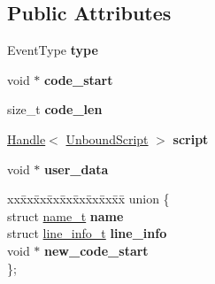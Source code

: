 \subsection*{Public Attributes}
\begin{DoxyCompactItemize}
\item 
\hypertarget{structv8_1_1_jit_code_event_ace1fbc4119ac3ef609d8e0f89cbc2c9f}{}Event\+Type {\bfseries type}\label{structv8_1_1_jit_code_event_ace1fbc4119ac3ef609d8e0f89cbc2c9f}

\item 
\hypertarget{structv8_1_1_jit_code_event_aeeac614e6c125bf08bf785b070090d0f}{}void $\ast$ {\bfseries code\+\_\+start}\label{structv8_1_1_jit_code_event_aeeac614e6c125bf08bf785b070090d0f}

\item 
\hypertarget{structv8_1_1_jit_code_event_ad56f78749d03f5db29ed417c2f3b4666}{}size\+\_\+t {\bfseries code\+\_\+len}\label{structv8_1_1_jit_code_event_ad56f78749d03f5db29ed417c2f3b4666}

\item 
\hypertarget{structv8_1_1_jit_code_event_a7c42ba82323ed1e91c5ef3f181c96d1e}{}\hyperlink{classv8_1_1_local}{Handle}$<$ \hyperlink{classv8_1_1_unbound_script}{Unbound\+Script} $>$ {\bfseries script}\label{structv8_1_1_jit_code_event_a7c42ba82323ed1e91c5ef3f181c96d1e}

\item 
\hypertarget{structv8_1_1_jit_code_event_a90597e06440ebd68fe582bd1361d6de6}{}void $\ast$ {\bfseries user\+\_\+data}\label{structv8_1_1_jit_code_event_a90597e06440ebd68fe582bd1361d6de6}

\item 
\hypertarget{structv8_1_1_jit_code_event_af7964de4fa0dd0e4cf77749493ab606c}{}\begin{tabbing}
xx\=xx\=xx\=xx\=xx\=xx\=xx\=xx\=xx\=\kill
union \{\\
\>struct \hyperlink{structv8_1_1_jit_code_event_1_1name__t}{name\_t} {\bfseries name}\\
\>struct \hyperlink{structv8_1_1_jit_code_event_1_1line__info__t}{line\_info\_t} {\bfseries line\_info}\\
\>void $\ast$ {\bfseries new\_code\_start}\\
\}; \label{structv8_1_1_jit_code_event_af7964de4fa0dd0e4cf77749493ab606c}
\\

\end{tabbing}\end{DoxyCompactItemize}


